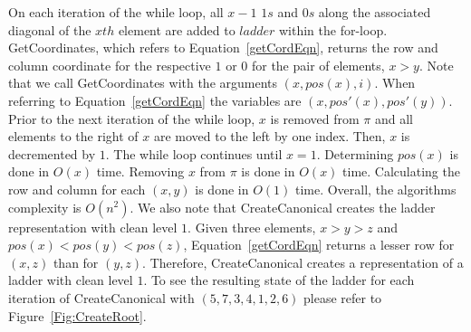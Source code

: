 On each iteration of the while loop, all $x-1$ $1s$ and $0s$  along the associated diagonal of the $xth$ 
element are added to $ladder$ within the for-loop. {\sc GetCoordinates}, which refers to Equation~\ref{getCordEqn}, 
returns the row and column coordinate for the respective $1$ or $0$ for the pair of elements, $x>y$. Note that we call {\sc GetCoordinates} with 
the arguments $(x,pos(x),i)$. When referring to Equation~\ref{getCordEqn} the variables 
are $(x,pos'(x),pos'(y))$. Prior to the next iteration of the while loop, 
$x$ is removed from $\pi$ and all elements to the right of $x$ are moved to the left by one index. 
Then, $x$ is decremented by $1$. The while loop continues until $x=1$. Determining $pos(x)$ 
is done in $O(x)$ time. Removing $x$ from $\pi$ is done in $O(x)$ time. Calculating the row and column 
for each $(x,y)$ is done in $O(1)$ time. Overall, the algorithms complexity is $O(n^2)$.
We also note that {\sc CreateCanonical} creates the ladder representation with clean level $1$.  
Given three elements, $x>y>z$ and $pos(x) < pos(y) < pos(z)$, Equation~\ref{getCordEqn} returns a lesser row 
for $(x,z)$ than for $(y,z)$. Therefore, {\sc CreateCanonical} creates a representation of a ladder with clean level $1$. 
To see the resulting state of the ladder for each iteration of {\sc CreateCanonical} with $(5,7,3,4,1,2,6)$ please refer to Figure~\ref{Fig:CreateRoot}. 
